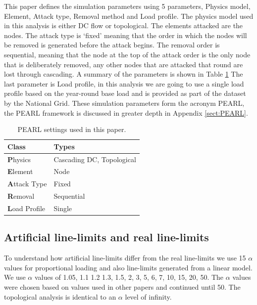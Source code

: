 \documentclass{article}
\begin{document}
This paper defines the simulation parameters using 5 parameters, Physics model, Element, Attack type, Removal method and Load profile. The physics model used in this analysis is either DC flow or topological. The elements attacked are the nodes. The attack type is `fixed' meaning that the order in which the nodes will be removed is generated before the attack begins. The removal order is sequential, meaning that the node at the top of the attack order is the only node that is deliberately removed, any other nodes that are attacked that round are lost through cascading. A summary of the parameters is shown in Table \ref{tab:PEARL} The last parameter is Load profile, in this analysis we are going to use a single load profile based on the year-round base load and is provided as part of the dataset by the National Grid. These simulation parameters form the acronym PEARL, the PEARL framework is discussed in greater depth in Appendix \ref{sect:PEARL}.

    \begin{table}
\centering
\caption{PEARL settings used in this paper.}
\label{tab:PEARL}
\begin{tabular}{l|l}
Class        & Types                     \\ \hline
\textbf{P}hysics       & Cascading DC, Topological \\
\textbf{E}lement      & Node\\
\textbf{A}ttack Type  & Fixed \\
\textbf{R}emoval      & Sequential \\
\textbf{L}oad Profile & Single         
\end{tabular}
\end{table}

\subsection{Artificial line-limits and real line-limits}
To understand how artificial line-limits differ from the real line-limits we use 15 $\alpha$ values for proportional loading and also line-limits generated from a linear model. 
We use $\alpha$ values of 1.05, 1.1 1.2 1.3, 1.5, 2, 3, 5, 6, 7, 10, 15, 20, 50. The $\alpha$ values were chosen based on values used in other papers and continued until 50. The topological analysis is identical to an $\alpha$ level of infinity.
\end{document}
